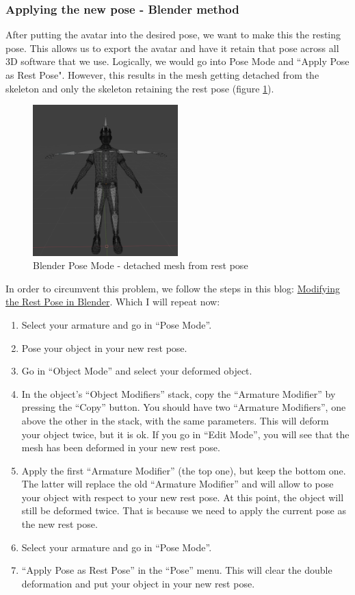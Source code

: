 \documentclass{uva-inf-article}
\begin{document}
\subsubsection{Applying the new pose - Blender method}\label{poseApplyBlender}
After putting the avatar into the desired pose, we want to make this the resting pose. This allows us to export the avatar and have it retain that pose across all 3D software that we use. Logically, we would go into Pose Mode and ``Apply Pose as Rest Pose". However, this results in the mesh getting detached from the skeleton and only the skeleton retaining the rest pose (figure \ref{fig:restPoseWrong}).
\begin{figure}[hbt!]
    \centering
    \includegraphics[width=0.5\textwidth]{imgs/wrongRest.png}
    \caption{Blender Pose Mode - detached mesh from rest pose}
    \label{fig:restPoseWrong}
\end{figure}
In order to circumvent this problem, we follow the steps in this blog: \href{https://nixart.wordpress.com/2013/03/28/modifying-the-rest-pose-in-blender/}{Modifying the Rest Pose in Blender}.
Which I will repeat now:
\begin{enumerate}
    \item Select your armature and go in “Pose Mode”.
    \item Pose your object in your new rest pose.
    \item Go in “Object Mode” and select your deformed object.
    \item In the object’s “Object Modifiers” stack, copy the “Armature Modifier” by pressing the “Copy” button. You should have two “Armature Modifiers”, one above the other in the stack, with the same parameters. This will deform your object twice, but it is ok. If you go in “Edit Mode”, you will see that the mesh has been deformed in your new rest pose.
    \item Apply the first “Armature Modifier” (the top one), but keep the bottom one. The latter will replace the old “Armature Modifier” and will allow to pose your object with respect to your new rest pose. At this point, the object will still be deformed twice. That is because we need to apply the current pose as the new rest pose.
    \item Select your armature and go in “Pose Mode”.
    \item “Apply Pose as Rest Pose” in the “Pose” menu. This will clear the double deformation and put your object in your new rest pose.
\end{enumerate}
\end{document}
